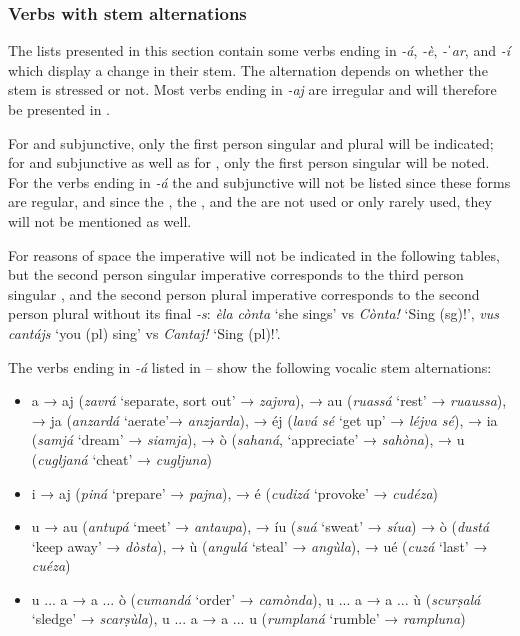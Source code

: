 \subsubsection{Verbs with stem alternations}\label{4.1.1.3}
The lists presented in this section contain some verbs ending in \textit{-á}, \textit{-è}, \textit{-ˈar}, and \textit{-í} which display a change in their stem. The alternation depends on whether the stem is stressed or not. Most verbs ending in \textit{-aj} are irregular and will therefore be presented in .

For  and subjunctive, only the first person singular and plural will be indicated; for  and subjunctive as well as for , only the first person singular will be noted. For the verbs ending in \textit{-á} the  and subjunctive will not be listed since these forms are regular, and since the , the , and the  are not used or only rarely used, they will not be mentioned as well.

For reasons of space the imperative will not be indicated in the following tables, but the second person singular imperative corresponds to the third person singular , and the second person plural imperative corresponds to the second person plural  without its final \textit{-s}: \textit{èla cònta} `she sings' vs \textit{Cònta!} `Sing (sg)!', \textit{vus cantájs} `you (pl) sing' vs \textit{Cantaj!} `Sing (pl)!'.

The verbs ending in \textit{-á} listed in -- show the following vocalic stem alternations:

\begin{itemize}
	\item a → aj (\textit{zavrá} `separate, sort out' → \textit{zajvra}), → au (\textit{ruassá} `rest' → \textit{ruaussa}), → ja (\textit{anzardá} `aerate'→ \textit{anzjarda}), → éj (\textit{lavá sé} `get up' → \textit{léjva sé}), → ia (\textit{samjá} `dream' → \textit{siamja}), → ò (\textit{sahaná},  `appreciate' → \textit{sahòna}), → u (\textit{cugljaná} `cheat' → \textit{cugljuna})
	\item i → aj (\textit{piná} `prepare' → \textit{pajna}), → é (\textit{cudizá} `provoke' → \textit{cudéza})
	\item u → au (\textit{antupá} `meet' → \textit{antaupa}), → íu (\textit{suá} `sweat' → \textit{síua}) → ò (\textit{dustá} `keep away' → \textit{dòsta}), → ù (\textit{angulá} `steal' → \textit{angùla}), → ué (\textit{cuzá} `last' → \textit{cuéza})
	\item u ... a → a ... ò (\textit{cumandá} `order' → \textit{camònda}), u ... a → a ... ù (\textit{scurṣalá} `sledge' → \textit{scarṣùla}), u ... a → a ... u (\textit{rumplaná} `rumble' → \textit{rampluna})
\end{itemize}

